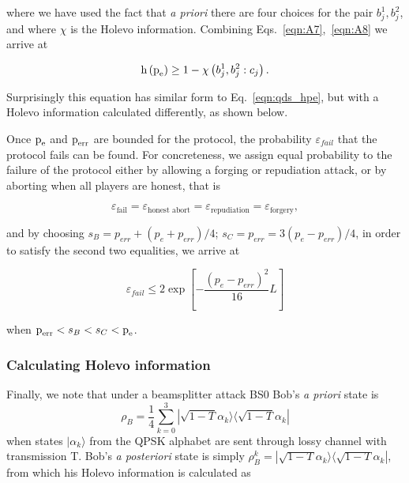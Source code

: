 \noindent where we have used the fact that \emph{a priori} there are four choices for the pair $b_j^1, b_j^2$, and where $\chi$ is the Holevo information. Combining Eqs.~\ref{eqn:A7},~\ref{eqn:A8} we arrive at

\begin{equation}
\text{h}\left(\text{p}_{\text{e}}\right) \ge 1 - \chi\left(b_j^1, b_j^2 : c_j\right).
\end{equation}

\noindent Surprisingly this equation has similar form to Eq.~\ref{eqn:qds_hpe}, but with a Holevo information calculated differently, as shown below. 


Once $\text{p}_{\text{e}}$ and $\text{p}_{\text{err}}$ are bounded for the protocol, the probability $\varepsilon_{fail}$ that the protocol fails can be found. For concreteness, we assign equal probability to the failure of the protocol either by allowing a forging or repudiation attack, or by aborting when all players are honest, that is

\begin{equation*}
\varepsilon_{\text{fail}} = \varepsilon_{\text{honest abort}} = \varepsilon_{\text{repudiation}} = \varepsilon_{\text{forgery}},
\end{equation*}

\noindent and by choosing $s_B = p_{err} + \left(p_e + p_{err}\right)/4$; $s_C = p_{err} = 3\left(p_e - p_{err}\right)/4$, in order to satisfy the second two equalities, we arrive at 

\begin{equation}\label{eqn:aqc_qdsb_efail}
\varepsilon_{fail} \le 2 \exp \left[ - \frac{\left( p_e - p_{err} \right)^2}{16} L \right]
\end{equation}

\noindent when $\text{p}_{\text{err}}< s_B < s_C < \text{p}_{\text{e}}$.

\subsubsection{Calculating Holevo information}

Finally, we note that under a beamsplitter attack BS$0$ Bob's \emph{a priori} state is
\begin{equation}\label{eqn:qdsb_apriori_state}
\rho_B = \frac{1}{4}\sum_{k=0}^3 |\sqrt{1-T}\alpha_k\rangle\langle\sqrt{1-T}\alpha_k|
\end{equation}
when states $|\alpha_k\rangle$ from the QPSK alphabet are sent through lossy channel with transmission T. Bob's \emph{a posteriori} state is simply $\rho_{B}^k = |\sqrt{1-T}\alpha_k\rangle\langle \sqrt{1-T}\alpha_k|$, from which his Holevo information is calculated as

